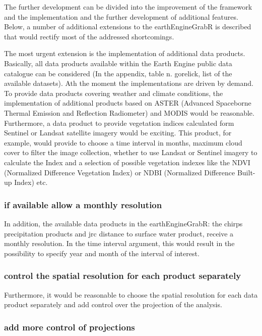 \documentclass[11pt,twoside,a4paper,final]{report}
\begin{document}
The further development can be divided into the improvement of the framework and the implementation and the further development of additional features.
Below, a number of additional extensions to the earthEngineGrabR is described that would rectify most of the addressed shortcomings.


The most urgent extension is the implementation of additional data products. Basically, all data products available within the Earth Engine public data catalogue can be considered (In the appendix, table n. gorelick, list of the available datasets). Ath the moment the implementations are driven by demand. To provide data products covering weather and climate conditions, the implementation of additional products based on ASTER (Advanced Spaceborne Thermal Emission and Reflection Radiometer) and MODIS would be reasonable. Furthermore, a data product to provide vegetation indices calculated form Sentinel or Landsat satellite imagery would be exciting. This product, for example, would provide to choose a time interval in months, maximum cloud cover to filter the image collection, whether to use Landsat or Sentinel imagery to calculate the Index and a selection of possible vegetation indexes like the NDVI (Normalized Difference Vegetation Index) or NDBI (Normalized Difference Built-up Index) etc. 

\subsubsection{if available allow a monthly resolution}
 

In addition, the available data products in the earthEngineGrabR: the chirps precipitation products and jrc distance to surface water product, receive a monthly resolution. In the time interval argument, this would result in the possibility to specify year and month of the interval of interest.

\subsubsection{control the spatial resolution for each product separately}
 



Furthermore, it would be reasonable to choose the spatial resolution for each data product separately and add control over the projection of the analysis. 


\subsubsection{add more control of projections}
 
\end{document}
